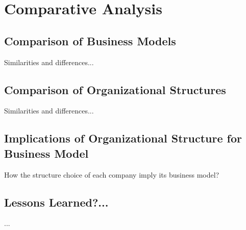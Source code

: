\chapter{Comparative Analysis}
\label{chap:comparison}

\section{Comparison of Business Models}

Similarities and differences...

\section{Comparison of Organizational Structures}

Similarities and differences...

\section{Implications of Organizational Structure for Business Model}

How the structure choice of each company imply its business model?

\section{Lessons Learned?...}

...